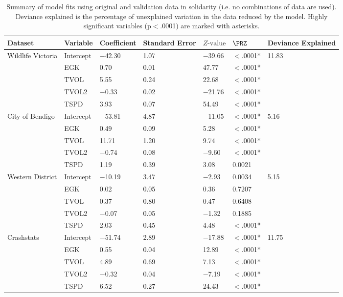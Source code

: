 \begin{table}[!t]
\caption[Summary of model fits using original and validation data]{Summary of model fits using original and validation data in solidarity (i.e. no combinations of data are used). Deviance explained is the percentage of unexplained variation in the data reduced by the model. Highly significant variables (p$<$.0001) are marked with asterisks.}
\centering
\begin{tabularx}{0.9\textwidth}{lllYllY} \toprule
Dataset & Variable & Coefficient & Standard Error & $Z\text{-value}$ & $\PRZ$ & Deviance Explained \\ 
  \midrule
Wildlife Victoria & Intercept & $-$42.30 & 1.07 & $-$39.66 & $<$.0001* & 11.83 \\ 
   & EGK & 0.70 & 0.01 & 47.77 & $<$.0001* &  \\ 
   & TVOL & 5.55 & 0.24 & 22.68 & $<$.0001* &  \\ 
   & TVOL2 & $-$0.33 & 0.02 & $-$21.76 & $<$.0001* &  \\ 
   & TSPD & 3.93 & 0.07 & 54.49 & $<$.0001* &  \\ 
  City of Bendigo & Intercept & $-$53.81 & 4.87 & $-$11.05 & $<$.0001* & 5.16 \\ 
   & EGK & 0.49 & 0.09 & 5.28 & $<$.0001* &  \\ 
   & TVOL & 11.71 & 1.20 & 9.74 & $<$.0001* &  \\ 
   & TVOL2 & $-$0.74 & 0.08 & $-$9.60 & $<$.0001* &  \\ 
   & TSPD & 1.19 & 0.39 & 3.08 & 0.0021 &  \\ 
  Western District & Intercept & $-$10.19 & 3.47 & $-$2.93 & 0.0034 & 5.15 \\ 
   & EGK & 0.02 & 0.05 & 0.36 & 0.7207 &  \\ 
   & TVOL & 0.37 & 0.80 & 0.47 & 0.6408 &  \\ 
   & TVOL2 & $-$0.07 & 0.05 & $-$1.32 & 0.1885 &  \\ 
   & TSPD & 2.03 & 0.45 & 4.48 & $<$.0001* &  \\ 
  Crashstats & Intercept & $-$51.74 & 2.89 & $-$17.88 & $<$.0001* & 11.75 \\ 
   & EGK & 0.55 & 0.04 & 12.89 & $<$.0001* &  \\ 
   & TVOL & 4.89 & 0.69 & 7.13 & $<$.0001* &  \\ 
   & TVOL2 & $-$0.32 & 0.04 & $-$7.19 & $<$.0001* &  \\ 
   & TSPD & 6.52 & 0.27 & 24.43 & $<$.0001* &  \\ 
\bottomrule
\end{tabularx}
\label{val_glm_perf}
\end{table}

